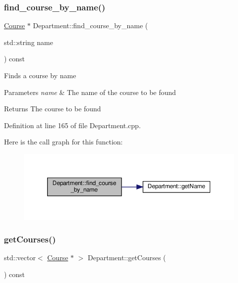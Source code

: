 \subsubsection{\texorpdfstring{find\+\_\+course\+\_\+by\+\_\+name()}{find\_course\_by\_name()}}
{\footnotesize\ttfamily \hyperlink{classCourse}{Course} $\ast$ Department\+::find\+\_\+course\+\_\+by\+\_\+name (\begin{DoxyParamCaption}\item[{std\+::string}]{name }\end{DoxyParamCaption}) const}

Finds a course by name 
\begin{DoxyParams}{Parameters}
{\em name} & The name of the course to be found \\
\hline
\end{DoxyParams}
\begin{DoxyReturn}{Returns}
The course to be found 
\end{DoxyReturn}


Definition at line 165 of file Department.\+cpp.

Here is the call graph for this function\+:\nopagebreak
\begin{figure}[H]
\begin{center}
\leavevmode
\includegraphics[width=350pt]{classDepartment_a2f776e8ddcf895cccdf60beb206b8620_cgraph}
\end{center}
\end{figure}
\mbox{\label{classDepartment_a1a350298618bf4be8cc42eabef377212}} 
\subsubsection{\texorpdfstring{get\+Courses()}{getCourses()}}
{\footnotesize\ttfamily std\+::vector$<$ \hyperlink{classCourse}{Course} $\ast$ $>$ Department\+::get\+Courses (\begin{DoxyParamCaption}{ }\end{DoxyParamCaption}) const}

